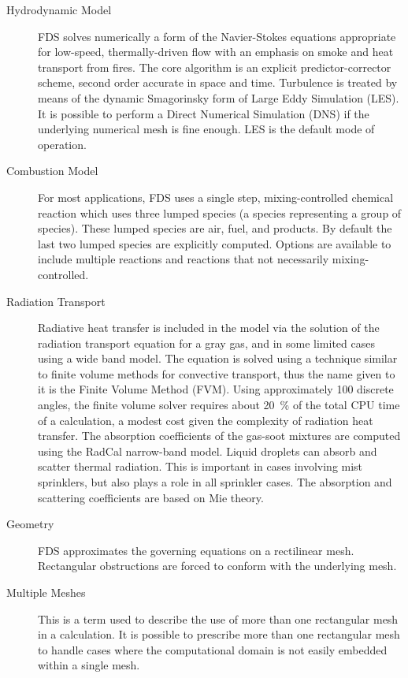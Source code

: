\documentclass[11pt]{book}
\begin{document}
\begin{description}
\item[Hydrodynamic Model]
FDS solves numerically a form of the Navier-Stokes equations appropriate
for low-speed, thermally-driven flow with an emphasis on
smoke and heat transport from fires. The core algorithm is an
explicit predictor-corrector scheme, second order accurate in space
and time. Turbulence is treated by means of the dynamic Smagorinsky form of
Large Eddy Simulation (LES). It is possible to perform a Direct
Numerical Simulation (DNS) if the underlying numerical mesh is fine
enough. LES is the default mode of operation.

\item[Combustion Model]
For most applications, FDS uses a single step, mixing-controlled chemical reaction which uses three lumped species (a species representing a group of species).
These lumped species are air, fuel, and products. By default the last two lumped species are explicitly
computed. Options are available to include multiple reactions and reactions that not necessarily mixing-controlled.

\item[Radiation Transport] Radiative heat transfer is included in the
model via the solution of the radiation transport equation for a
gray gas, and in some limited cases using a wide band
model.  The equation is solved using a technique similar to finite
volume methods for convective transport, thus the name given to it is
the Finite Volume Method (FVM).  Using approximately 100 discrete
angles, the finite volume solver requires about 20~\% of the total CPU
time of a calculation, a modest cost given the complexity of radiation
heat transfer. The absorption coefficients of the gas-soot mixtures
are computed using the RadCal narrow-band model.  Liquid droplets can
absorb and scatter thermal radiation. This is important in cases
involving mist sprinklers, but also plays a role in all sprinkler
cases.  The absorption and scattering coefficients are based on Mie
theory.

\item[Geometry]
FDS approximates the governing equations on a rectilinear mesh.
Rectangular obstructions are forced to conform with the underlying mesh.

\item[Multiple Meshes] This is a term used to describe the use of
more than one rectangular mesh in a calculation. It is possible to prescribe
more than one rectangular mesh to handle cases where the computational
domain is not easily embedded within a single mesh.


\end{description}
\end{document}
